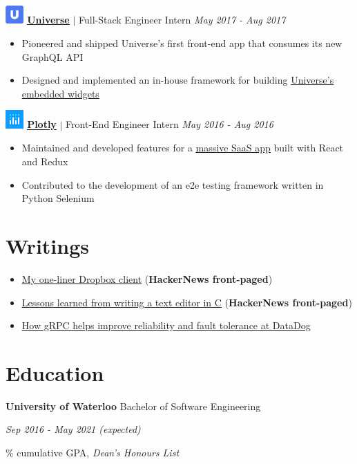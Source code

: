 \documentclass[paper=a4,fontsize=15pt]{scrartcl}
\newcommand{\quarterspace}{\vspace*{0.25em}}
\newcommand{\fullspace}{\vspace*{1em}}
\begin{document}
\fullspace
\noindent \includegraphics[width=0.7cm, height=0.7cm]{assets/universe.png}
\normalsize
\noindent \href{https://universe.com}{\ul{\textbf{Universe}}}
$\vert$ \small Full-Stack Engineer Intern
{\hfill \footnotesize \textit{May 2017 - Aug 2017}}
\begin{itemize}[noitemsep,leftmargin=20pt,label=\raisebox{0.25ex}{\tiny$\bullet$},topsep=5pt]
  \small
  \item Pioneered and shipped Universe's first front-end app that consumes its
    new GraphQL API
  \item Designed and implemented an in-house framework for building
    \href{https://www.universe.com/sell-tickets-on-your-website-with-universe-widgets}{\ul{Universe's
        embedded widgets}}
\end{itemize}

\fullspace
\noindent \includegraphics[width=0.7cm, height=0.7cm]{assets/plotly.png}
\normalsize
\noindent \href{https://plot.ly}{\textbf{\ul{Plotly}}}
$\vert$ \small Front-End Engineer Intern
{\hfill \footnotesize \textit{May 2016 - Aug 2016}}
\begin{itemize}[noitemsep,leftmargin=20pt,label=\raisebox{0.25ex}{\tiny$\bullet$},topsep=5pt]
  \small
  \item Maintained and developed features for a
    \href{https://plot.ly/online-chart-maker/}{\ul{massive SaaS app}} built with
    React and Redux
  \item Contributed to the development of an e2e testing framework written in
    Python Selenium
\end{itemize}

\section*{Writings}{}
\begin{itemize}[noitemsep,leftmargin=20pt,label=\raisebox{0.25ex}{\tiny$\bullet$},topsep=5pt]
  \small
  \item \href{http://lpan.io/one-liner-dropbox-client}{\ul{My one-liner Dropbox
        client}} (\textbf{HackerNews front-paged})
  \item \href{http://lpan.io/what-i-learnt-from-viw}{\ul{Lessons learned from
        writing a text editor in C}} (\textbf{HackerNews front-paged})
  \item \href{http://lpan.io/migrating-to-grpc}{\ul{How gRPC helps improve
        reliability and fault tolerance at DataDog}}
\end{itemize}

\section*{Education}{}
\noindent \textbf{University of Waterloo} Bachelor of Software Engineering \par
\quarterspace
\footnotesize
\noindent \textit{Sep 2016 - May 2021 (expected)} \par
{}\% cumulative GPA, \textit{Dean's Honours List}
\end{document}

